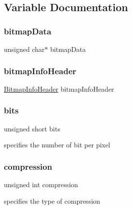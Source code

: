 \subsection{Variable Documentation}
\hypertarget{group___bitmap_ga586c4bcc42cf22a033e8f60f24f627f0}{}\label{group___bitmap_ga586c4bcc42cf22a033e8f60f24f627f0} 
\subsubsection{\texorpdfstring{bitmap\+Data}{bitmapData}}
{\footnotesize\ttfamily unsigned char$\ast$ bitmap\+Data}

\hypertarget{group___bitmap_ga7157ca7f3ce4be47481c472fafd89313}{}\label{group___bitmap_ga7157ca7f3ce4be47481c472fafd89313} 
\subsubsection{\texorpdfstring{bitmap\+Info\+Header}{bitmapInfoHeader}}
{\footnotesize\ttfamily \hyperlink{struct_bitmap_info_header}{Bitmap\+Info\+Header} bitmap\+Info\+Header}

\hypertarget{group___bitmap_ga47d1d4d776f8fd3bb0f7dbc3c5aeb534}{}\label{group___bitmap_ga47d1d4d776f8fd3bb0f7dbc3c5aeb534} 
\subsubsection{\texorpdfstring{bits}{bits}}
{\footnotesize\ttfamily unsigned short bits}



specifies the number of bit per pixel 

\hypertarget{group___bitmap_gad180079f62b44e49ec672c9ef6e078b3}{}\label{group___bitmap_gad180079f62b44e49ec672c9ef6e078b3} 
\subsubsection{\texorpdfstring{compression}{compression}}
{\footnotesize\ttfamily unsigned int compression}



specifies the type of compression 


